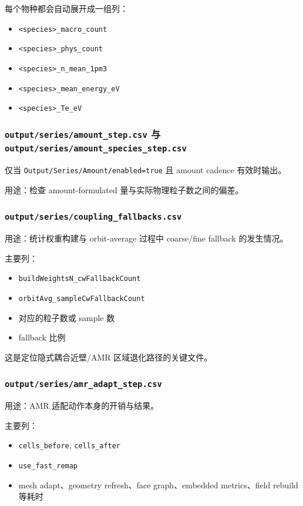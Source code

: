 \documentclass[11pt,a4paper]{ctexart}
\newcommand{\code}[1]{\texttt{#1}}
\newcommand{\file}[1]{\texttt{#1}}
\begin{document}
每个物种都会自动展开成一组列：

\begin{itemize}
  \item \code{<species>\_macro\_count}
  \item \code{<species>\_phys\_count}
  \item \code{<species>\_n\_mean\_1pm3}
  \item \code{<species>\_mean\_energy\_eV}
  \item \code{<species>\_Te\_eV}
\end{itemize}

\subsubsection{\file{output/series/amount\_step.csv} 与 \file{output/series/amount\_species\_step.csv}}

仅当 \code{Output/Series/Amount/enabled=true} 且 amount cadence 有效时输出。

用途：检查 amount-formulated 量与实际物理粒子数之间的偏差。

\subsubsection{\file{output/series/coupling\_fallbacks.csv}}

用途：统计权重构建与 orbit-average 过程中 coarse/fine fallback 的发生情况。

主要列：

\begin{itemize}
  \item \code{buildWeightsN\_cwFallbackCount}
  \item \code{orbitAvg\_sampleCwFallbackCount}
  \item 对应的粒子数或 sample 数
  \item fallback 比例
\end{itemize}

这是定位隐式耦合近壁/AMR 区域退化路径的关键文件。

\subsubsection{\file{output/series/amr\_adapt\_step.csv}}

用途：AMR 适配动作本身的开销与结果。

主要列：

\begin{itemize}
  \item \code{cells\_before}, \code{cells\_after}
  \item \code{use\_fast\_remap}
  \item mesh adapt、geometry refresh、face graph、embedded metrics、field rebuild 等耗时
\end{itemize}
\end{document}
